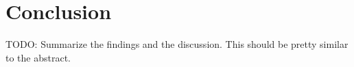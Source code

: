 \section{Conclusion}
TODO: Summarize the findings and the discussion. This should be pretty similar to the abstract.